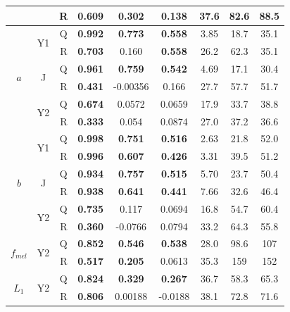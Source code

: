 \begin{table}[h!]
\begin{tabular}{|ccc|ccc|ccc|}
        & & R & \textbf{0.609} & \textbf{0.302} & 0.138 & 37.6 & 82.6 & 88.5 \\
        \hline
        \multirow{6}{*}{$a$} & \multirow{2}{*}{Y1} & Q & \textbf{0.992} & \textbf{0.773} & \textbf{0.558} & 3.85 & 18.7 & 35.1 \\
        & & R & \textbf{0.703} & 0.160 & \textbf{0.558} & 26.2 & 62.3 & 35.1 \\
        \cline{2-9}
        & \multirow{2}{*}{J} & Q & \textbf{0.961} & \textbf{0.759} & \textbf{0.542} & 4.69 & 17.1 & 30.4 \\
        & & R & \textbf{0.431} & -0.00356 & 0.166 & 27.7 & 57.7 & 51.7 \\
        \cline{2-9}
        & \multirow{2}{*}{Y2} & Q & \textbf{0.674} & 0.0572 & 0.0659 & 17.9 & 33.7 & 38.8 \\
        & & R & \textbf{0.333} & 0.054 & 0.0874 & 27.0 & 37.2 & 36.6 \\
        \hline
        \multirow{6}{*}{$b$} & \multirow{2}{*}{Y1} & Q & \textbf{0.998} & \textbf{0.751} & \textbf{0.516} & 2.63 & 21.8 & 52.0 \\
        & & R & \textbf{0.996} & \textbf{0.607} & \textbf{0.426} & 3.31 & 39.5 & 51.2 \\
        \cline{2-9}
        & \multirow{2}{*}{J} & Q & \textbf{0.934} & \textbf{0.757} & \textbf{0.515} & 5.70 & 23.7 & 50.4 \\
        & & R & \textbf{0.938} & \textbf{0.641} & \textbf{0.441} & 7.66 & 32.6 & 46.4 \\
        \cline{2-9}
        & \multirow{2}{*}{Y2} & Q & \textbf{0.735} & 0.117 & 0.0694 & 16.8 & 54.7 & 60.4 \\
        & & R & \textbf{0.360} & -0.0766 & 0.0794 & 33.2 & 64.3 & 55.8 \\
        \hline
        \multirow{2}{*}{$f_{mel}$} & \multirow{2}{*}{Y2} & Q & \textbf{0.852} & \textbf{0.546} & \textbf{0.538} & 28.0 & 98.6 & 107 \\ 
        & & R & \textbf{0.517} & \textbf{0.205} & 0.0613 & 35.3 & 159 & 152 \\
        \hline
        \multirow{2}{*}{$L_1$} & \multirow{2}{*}{Y2} & Q & \textbf{0.824} & \textbf{0.329} & \textbf{0.267} & 36.7 & 58.3 & 65.3 \\
        & & R & \textbf{0.806} & 0.00188 & -0.0188 & 38.1 & 72.8 & 71.6 \\
        \hline
    \end{tabular}    
    \label{tb:backwardsHSIMC}
\end{table}


